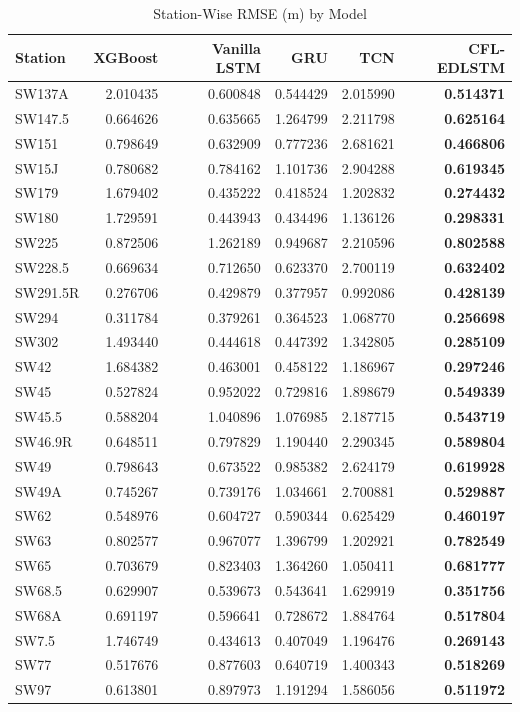 \begin{table}[htbp]
  \centering
  \caption{Station-Wise RMSE (m) by Model}
  \label{tab:4.2b}
  \small
  \begin{tabular}{@{}l r r r r >{\columncolor{gray!15}\bfseries}r@{}}
    \toprule
    \textbf{Station} & \textbf{XGBoost} & \textbf{Vanilla LSTM} & \textbf{GRU} & \textbf{TCN} & \textbf{CFL-EDLSTM} \\
    \midrule
    SW137A & 2.010435 & 0.600848 & 0.544429 & 2.015990 & 0.514371 \\
    SW147.5 & 0.664626 & 0.635665 & 1.264799 & 2.211798 & 0.625164 \\
    SW151 & 0.798649 & 0.632909 & 0.777236 & 2.681621 & 0.466806 \\
    SW15J & 0.780682 & 0.784162 & 1.101736 & 2.904288 & 0.619345 \\
    SW179 & 1.679402 & 0.435222 & 0.418524 & 1.202832 & 0.274432 \\
    SW180 & 1.729591 & 0.443943 & 0.434496 & 1.136126 & 0.298331 \\
    SW225 & 0.872506 & 1.262189 & 0.949687 & 2.210596 & 0.802588 \\
    SW228.5 & 0.669634 & 0.712650 & 0.623370 & 2.700119 & 0.632402 \\
    SW291.5R & 0.276706 & 0.429879 & 0.377957 & 0.992086 & 0.428139 \\
    SW294 & 0.311784 & 0.379261 & 0.364523 & 1.068770 & 0.256698 \\
    SW302 & 1.493440 & 0.444618 & 0.447392 & 1.342805 & 0.285109 \\
    SW42 & 1.684382 & 0.463001 & 0.458122 & 1.186967 & 0.297246 \\
    SW45 & 0.527824 & 0.952022 & 0.729816 & 1.898679 & 0.549339 \\
    SW45.5 & 0.588204 & 1.040896 & 1.076985 & 2.187715 & 0.543719 \\
    SW46.9R & 0.648511 & 0.797829 & 1.190440 & 2.290345 & 0.589804 \\
    SW49 & 0.798643 & 0.673522 & 0.985382 & 2.624179 & 0.619928 \\
    SW49A & 0.745267 & 0.739176 & 1.034661 & 2.700881 & 0.529887 \\
    SW62 & 0.548976 & 0.604727 & 0.590344 & 0.625429 & 0.460197 \\
    SW63 & 0.802577 & 0.967077 & 1.396799 & 1.202921 & 0.782549 \\
    SW65 & 0.703679 & 0.823403 & 1.364260 & 1.050411 & 0.681777 \\
    SW68.5 & 0.629907 & 0.539673 & 0.543641 & 1.629919 & 0.351756 \\
    SW68A & 0.691197 & 0.596641 & 0.728672 & 1.884764 & 0.517804 \\
    SW7.5 & 1.746749 & 0.434613 & 0.407049 & 1.196476 & 0.269143 \\
    SW77 & 0.517676 & 0.877603 & 0.640719 & 1.400343 & 0.518269 \\
    SW97 & 0.613801 & 0.897973 & 1.191294 & 1.586056 & 0.511972 \\
    \bottomrule
  \end{tabular}
\end{table}

